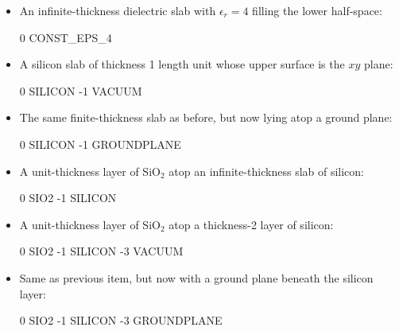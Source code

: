 \documentclass[letterpaper]{article}
\begin{document}
\begin{itemize}

\item An infinite-thickness dielectric slab with $\epsilon_r=4$ filling
the lower half-space:

\medskip
\begin{verbcode}
0 CONST_EPS_4
\end{verbcode}
\medskip

\item A silicon slab of thickness 1 length unit whose upper surface is
the $xy$ plane:

\medskip
\begin{verbcode}
 0 SILICON
-1 VACUUM
\end{verbcode}

\item The same finite-thickness slab as before, but now 
lying atop a ground plane:

\medskip
\begin{verbcode}
 0 SILICON
-1 GROUNDPLANE
\end{verbcode}
\medskip

\item A unit-thickness layer of SiO$_2$ atop an infinite-thickness
slab of silicon:

\medskip
\begin{verbcode}
 0 SIO2
-1 SILICON
\end{verbcode}

\item A unit-thickness layer of SiO$_2$ atop a thickness-2 layer 
of silicon:

\medskip
\begin{verbcode}
 0 SIO2
-1 SILICON
-3 VACUUM
\end{verbcode}

\item Same as previous item, but now with a ground plane beneath
the silicon layer:

\medskip
\begin{verbcode}
 0 SIO2
-1 SILICON
-3 GROUNDPLANE
\end{verbcode}
\end{itemize}
\end{document}
